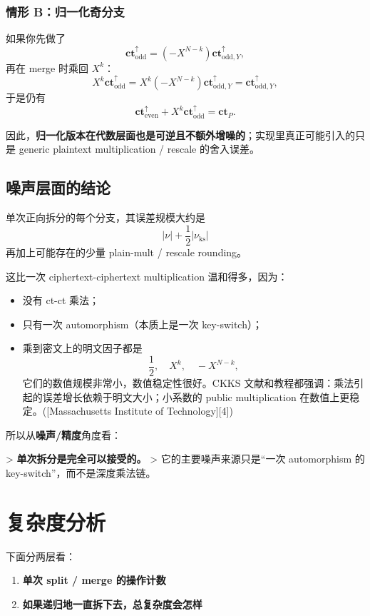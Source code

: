 \documentclass{article}
\newcommand{\ct}{\mathbf{ct}}
\begin{document}
\subsubsection{情形 B：归一化奇分支}

如果你先做了
\[
\ct_{\mathrm{odd}}^{\uparrow}=(-X^{N-k})\ct_{\mathrm{odd},Y}^{\uparrow},
\]
再在 merge 时乘回 \(X^k\)：
\[
X^k \ct_{\mathrm{odd}}^{\uparrow} = X^k(-X^{N-k})\ct_{\mathrm{odd},Y}^{\uparrow} = \ct_{\mathrm{odd},Y}^{\uparrow},
\]
于是仍有
\[
\ct_{\mathrm{even}}^{\uparrow}+X^k\ct_{\mathrm{odd}}^{\uparrow} = \ct_P.
\]

因此，\textbf{归一化版本在代数层面也是可逆且不额外增噪的}；实现里真正可能引入的只是 generic plaintext multiplication / rescale 的舍入误差。

\subsection{噪声层面的结论}

单次正向拆分的每个分支，其误差规模大约是
\[
|\nu|+\frac12|\nu_{\mathrm{ks}}|
\]
再加上可能存在的少量 plain-mult / rescale rounding。

这比一次 ciphertext-ciphertext multiplication 温和得多，因为：

\begin{itemize}
    \item 没有 ct-ct 乘法；
    \item 只有一次 automorphism（本质上是一次 key-switch）；
    \item 乘到密文上的明文因子都是
    \[
    \frac12,\quad X^k,\quad -X^{N-k},
    \]
    它们的数值规模非常小，数值稳定性很好。CKKS 文献和教程都强调：乘法引起的误差增长依赖于明文大小；小系数的 public multiplication 在数值上更稳定。([Massachusetts Institute of Technology][4])
\end{itemize}

所以从\textbf{噪声/精度}角度看：

> \textbf{单次拆分是完全可以接受的。}
> 它的主要噪声来源只是“一次 automorphism 的 key-switch”，而不是深度乘法链。

\section{复杂度分析}

下面分两层看：

\begin{enumerate}
    \item \textbf{单次 split / merge 的操作计数}
    \item \textbf{如果递归地一直拆下去，总复杂度会怎样}
\end{enumerate}
\end{document}
